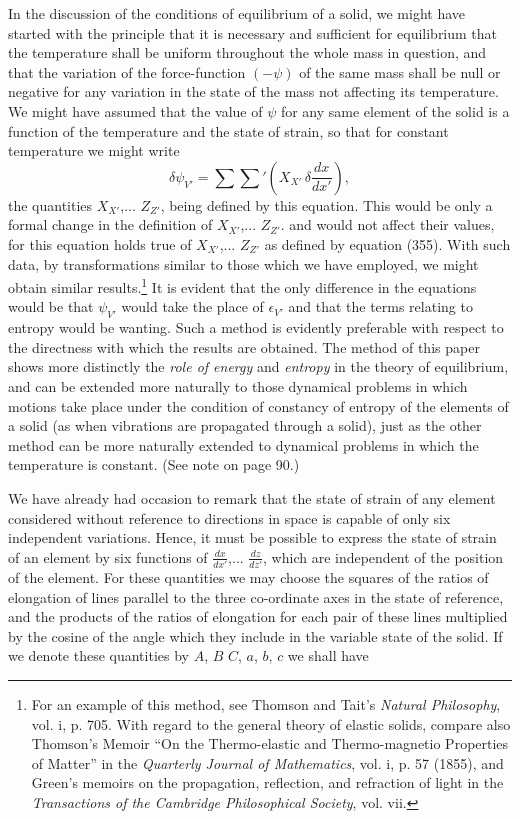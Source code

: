 \documentclass[12pt]{memoir}
\begin{document}
{In the discussion of the conditions of equilibrium of a solid, we might have started with the principle that it is necessary and sufficient for equilibrium that the temperature shall be uniform throughout the whole mass in question, and that the variation of the force-function $(-\psi)$ of the same mass shall be null or negative for any variation in the state of the mass not affecting its temperature.  We might have assumed that the value of $\psi$ for any same element of the solid is a function of the temperature and the state of strain, so that for constant temperature we might write
$$ \delta \psi_{V'} = \sum \sum\nolimits' \left( X_{X'}\,\delta \frac{dx}{dx'}\right) ,  $$
the quantities $X_{X'}$,... $Z_{Z'}$, being defined by this equation. This would be only a formal change in the definition of $X_{X'}$,... $Z_{Z'}$. and would not affect their values, for this equation holds true of $X_{X'}$,... $Z_{Z'}$ as defined by equation (355). With such data, by transformations similar to those which we have employed, we might obtain similar results.\footnote{For an example of this method, see Thomson and Tait's \textit{Natural Philosophy}, vol. i, p. 705. With regard to the general theory of elastic solids, compare also Thomson's Memoir ``On the Thermo-elastic and Thermo-magnetio Properties of Matter'' in the \textit{Quarterly Journal of Mathematics}, vol. i, p. 57 (1855), and Green's memoirs on the propagation, reflection, and refraction of light in the \textit{Transactions of the Cambridge Philosophical Society}, vol. vii.} It is evident that the only difference in the equations would be that $\psi_{V'}$ would take the place of $\epsilon_{V'}$ and that the terms relating to entropy would be wanting. Such a method is evidently preferable with respect to the directness with which the results are obtained. The method of this paper shows more distinctly the \textit{role of energy} and \textit{entropy} in the theory of equilibrium, and can be extended more naturally to those dynamical problems in which motions take place under the condition of constancy of entropy of the elements of a solid (as when vibrations are propagated through a solid), just as the other method can be more naturally extended to dynamical problems in which the temperature is constant. (See note on page 90.)


We have already had occasion to remark that the state of strain of any element considered without reference to directions in space is capable of only six independent variations. Hence, it must be possible to express the state of strain of an element by six functions of $\frac{dx}{dx'}$,... $\frac{dz}{dz'}$, which are independent of the position of the element. For these quantities we may choose the squares of the ratios of elongation of lines parallel to the three co-ordinate axes in the state of reference, and the products of the ratios of elongation for each pair of these lines multiplied by the cosine of the angle which they include in the variable state of the solid. If we denote these quantities by $A$, $B$ $C$, $a$, $b$, $c$ we shall have



}
\end{document}
